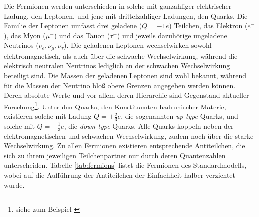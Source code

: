 Die Fermionen werden unterschieden in solche mit ganzahliger elektrischer
Ladung, den Leptonen, und jene mit drittelzahliger Ladungen, den Quarks. Die
Familie der Leptonen umfasst drei geladene ($Q=-1e$) Teilchen, das Elektron
($e^-$), das Myon ($\mu^-$) und das Tauon ($\tau^-$) und jeweils dazuhörige
ungeladene Neutrinos ($\nu_e,\nu_\mu,\nu_\tau$). Die geladenen Leptonen
wechselwirken sowohl elektromagnetisch, als auch über die schwache
Wechselwirkung, während die elektrisch neutralen Neutrinos lediglich an der
schwachen Wechselwirkung beteiligt sind. Die Massen der geladenen Leptonen sind
wohl bekannt, während für die Massen der Neutrino bloß obere Grenzen angegeben
werden können. Deren absolute Werte und vor allem deren Hierarchie sind
Gegenstand aktueller Forschung\footnote{siehe zum Beispiel
\cite{Winter:2013ema}}. Unter den Quarks, den Konstituenten hadronischer
Materie, existieren solche mit Ladung $Q=+\tfrac{2}{3}e$, die sogenannten
\textit{up-type} Quarks, und solche mit $Q=-\tfrac{1}{3}e$, die
\textit{down-type} Quarks. Alle Quarks koppeln neben der elektromagnetischen
und schwachen Wechselwirkung, zudem noch über die starke Wechselwirkung.
Zu allen Fermionen existieren entsprechende Antiteilchen, die sich zu ihrem
jeweiligen Teilchenpartner nur durch deren Quantenzahlen unterscheiden. Tabelle
\ref{tab:fermions} listet die Fermionen des Standardmodells, wobei auf die
Aufführung der Antiteilchen der Einfachheit halber verzichtet wurde.

